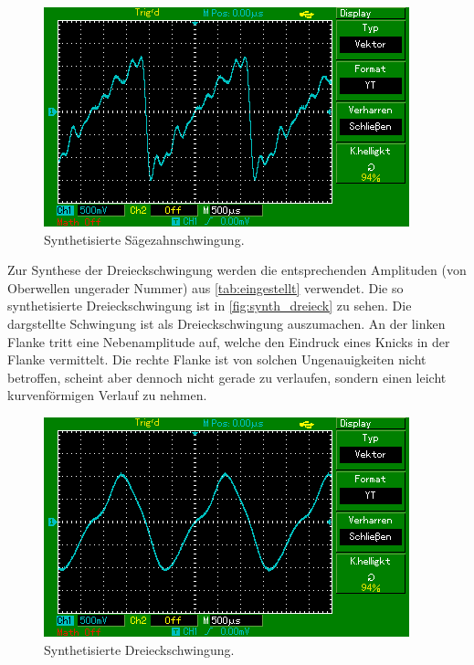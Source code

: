 \begin{figure}
  \centering
  \includegraphics{content/MAP001.png}
  \caption{Synthetisierte Sägezahnschwingung.}
  \label{fig:synth_saegezahn}
\end{figure}

Zur Synthese der Dreieckschwingung werden die entsprechenden Amplituden (von Oberwellen ungerader Nummer) aus \autoref{tab:eingestellt} verwendet.
Die so synthetisierte Dreieckschwingung ist in \autoref{fig:synth_dreieck} zu sehen. Die dargstellte Schwingung ist als 
Dreieckschwingung auszumachen. An der linken Flanke tritt eine Nebenamplitude auf, welche den Eindruck eines Knicks in der 
Flanke vermittelt. Die rechte Flanke ist von solchen Ungenauigkeiten nicht betroffen, scheint aber dennoch nicht gerade zu
verlaufen, sondern einen leicht kurvenförmigen Verlauf zu nehmen.  

\begin{figure}
  \centering
  \includegraphics{content/MAP003.png}
  \caption{Synthetisierte Dreieckschwingung.}
  \label{fig:synth_dreieck}
\end{figure}